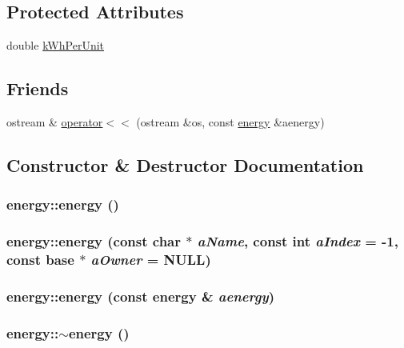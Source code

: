 \subsection*{Protected Attributes}
\begin{DoxyCompactItemize}
\item 
double \hyperlink{classenergy_a019d21c451c9235ae6e999308c48c05d}{kWhPerUnit}
\end{DoxyCompactItemize}
\subsection*{Friends}
\begin{DoxyCompactItemize}
\item 
ostream \& \hyperlink{classenergy_a2dc316263ecd43c6bc3bafcffda896f9}{operator$<$$<$} (ostream \&os, const \hyperlink{classenergy}{energy} \&aenergy)
\end{DoxyCompactItemize}


\subsection{Constructor \& Destructor Documentation}
\hypertarget{classenergy_adb9b3923c92c41cba7ac1928d85ed713}{
\subsubsection[{energy}]{\setlength{\rightskip}{0pt plus 5cm}energy::energy ()}}
\label{classenergy_adb9b3923c92c41cba7ac1928d85ed713}
\hypertarget{classenergy_a86a3f0b749467778796dd2b68fe54b5c}{
\subsubsection[{energy}]{\setlength{\rightskip}{0pt plus 5cm}energy::energy (const char $\ast$ {\em aName}, \/  const int {\em aIndex} = {\ttfamily -\/1}, \/  const {\bf base} $\ast$ {\em aOwner} = {\ttfamily NULL})}}
\label{classenergy_a86a3f0b749467778796dd2b68fe54b5c}
\hypertarget{classenergy_a2bc4d056b6f3f07f3f3fec1c6240d464}{
\subsubsection[{energy}]{\setlength{\rightskip}{0pt plus 5cm}energy::energy (const {\bf energy} \& {\em aenergy})}}
\label{classenergy_a2bc4d056b6f3f07f3f3fec1c6240d464}
\hypertarget{classenergy_a96e29d339fe11ddb48d8e17e0d52c0d3}{
\subsubsection[{$\sim$energy}]{\setlength{\rightskip}{0pt plus 5cm}energy::$\sim$energy ()}}
\label{classenergy_a96e29d339fe11ddb48d8e17e0d52c0d3}


